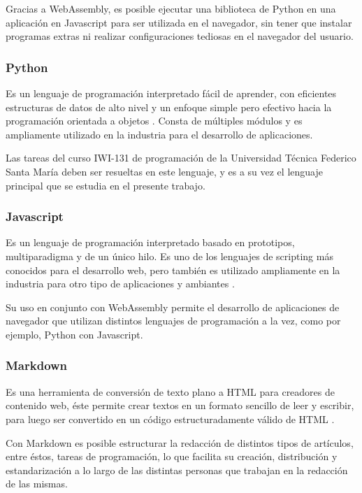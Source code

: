 \documentclass[letterpaper,12pt]{article}
\begin{document}
Gracias a WebAssembly, es posible ejecutar una biblioteca de Python en una aplicación en Javascript para ser utilizada en el navegador, sin tener que instalar programas extras ni realizar configuraciones tediosas en el navegador del usuario.

\subsubsection{Python}

Es un lenguaje de programación interpretado fácil de aprender, con eficientes estructuras de datos de alto nivel y un enfoque simple pero efectivo hacia la programación orientada a objetos \cite{PythonWebsite}. Consta de múltiples módulos y es ampliamente utilizado en la industria para el desarrollo de aplicaciones.

Las tareas del curso IWI-131 de programación de la Universidad Técnica Federico Santa María deben ser resueltas en este lenguaje, y es a su vez el lenguaje principal que se estudia en el presente trabajo.

\subsubsection{Javascript}

Es un lenguaje de programación interpretado basado en prototipos, multiparadigma y de un único hilo. Es uno de los lenguajes de scripting más conocidos para el desarrollo web, pero también es utilizado ampliamente en la industria para otro tipo de aplicaciones y ambiantes \cite{MDNJavaScript}.

Su uso en conjunto con WebAssembly permite el desarrollo de aplicaciones de navegador que utilizan distintos lenguajes de programación a la vez, como por ejemplo, Python con Javascript.

\subsubsection{Markdown}

Es una herramienta de conversión de texto plano a HTML para creadores de contenido web, éste permite crear textos en un formato sencillo de leer y escribir, para luego ser convertido en un código estructuradamente válido de HTML \cite{DFMarkdown}.

Con Markdown es posible estructurar la redacción de distintos tipos de artículos, entre éstos, tareas de programación, lo que facilita su creación, distribución y estandarización a lo largo de las distintas personas que trabajan en la redacción de las mismas.
\end{document}
